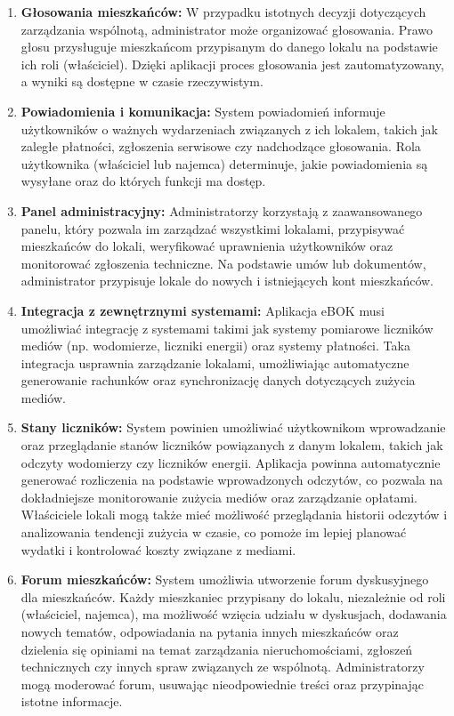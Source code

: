 \begin{enumerate}[label=\arabic*.]
	\item \textbf{Głosowania mieszkańców:} W przypadku istotnych decyzji dotyczących zarządzania wspólnotą, administrator może organizować głosowania. Prawo głosu przysługuje mieszkańcom przypisanym do danego lokalu na podstawie ich roli (właściciel). Dzięki aplikacji proces głosowania jest zautomatyzowany, a wyniki są dostępne w czasie rzeczywistym.

	\item \textbf{Powiadomienia i komunikacja:} System powiadomień informuje użytkowników o ważnych wydarzeniach związanych z ich lokalem, takich jak zaległe płatności, zgłoszenia serwisowe czy nadchodzące głosowania. Rola użytkownika (właściciel lub najemca) determinuje, jakie powiadomienia są wysyłane oraz do których funkcji ma dostęp.

	\item \textbf{Panel administracyjny:} Administratorzy korzystają z zaawansowanego panelu, który pozwala im zarządzać wszystkimi lokalami, przypisywać mieszkańców do lokali, weryfikować uprawnienia użytkowników oraz monitorować zgłoszenia techniczne. Na podstawie umów lub dokumentów, administrator przypisuje lokale do nowych i istniejących kont mieszkańców.

	\item \textbf{Integracja z zewnętrznymi systemami:} Aplikacja eBOK musi umożliwiać integrację z systemami takimi jak systemy pomiarowe liczników mediów (np. wodomierze, liczniki energii) oraz systemy płatności. Taka integracja usprawnia zarządzanie lokalami, umożliwiając automatyczne generowanie rachunków oraz synchronizację danych dotyczących zużycia mediów.

	\item \textbf{Stany liczników:} System powinien umożliwiać użytkownikom wprowadzanie oraz przeglądanie stanów liczników powiązanych z danym lokalem, takich jak odczyty wodomierzy czy liczników energii. Aplikacja powinna automatycznie generować rozliczenia na podstawie wprowadzonych odczytów, co pozwala na dokładniejsze monitorowanie zużycia mediów oraz zarządzanie opłatami. Właściciele lokali mogą także mieć możliwość przeglądania historii odczytów i analizowania tendencji zużycia w czasie, co pomoże im lepiej planować wydatki i kontrolować koszty związane z mediami.
	
	\item \textbf{Forum mieszkańców:} System umożliwia utworzenie forum dyskusyjnego dla mieszkańców. Każdy mieszkaniec przypisany do lokalu, niezależnie od roli (właściciel, najemca), ma możliwość wzięcia udziału w dyskusjach, dodawania nowych tematów, odpowiadania na pytania innych mieszkańców oraz dzielenia się opiniami na temat zarządzania nieruchomościami, zgłoszeń technicznych czy innych spraw związanych ze wspólnotą. Administratorzy mogą moderować forum, usuwając nieodpowiednie treści oraz przypinając istotne informacje.


\end{enumerate}


